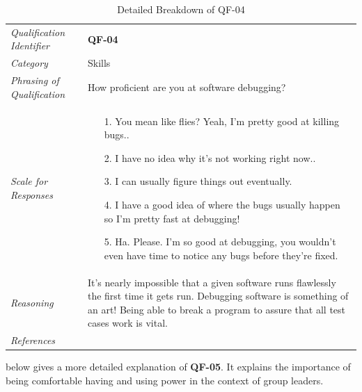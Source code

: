 \documentclass[12pt,letterpaper]{article}
\begin{document}
\begin{table}[H]
	\caption{Detailed Breakdown of QF-04}
	\begin{tabu} to 
		\toprule
		Qualification Identifier & {\bf QF-04}\\
		Category & Skills \\
		Phrasing of Qualification & How proficient are you at software debugging? \\
		Scale for Responses &
		\begin{minipage}[t]{\linewidth}
			\begin{enumerate}
				\item[1.] You mean like flies? Yeah, I'm pretty good at killing bugs..
				\item[2.] I have no idea why it's not working right now..
				\item[3.] I can usually figure things out eventually.
				\item[4.] I have a good idea of where the bugs usually happen so I'm pretty fast at debugging!
				\item[5.] Ha. Please. I'm so good at debugging, you wouldn't even have time to notice any bugs before they're fixed.
			\end{enumerate}
		\end{minipage}\\
		Reasoning & It's nearly impossible that a given software runs flawlessly the first time it gets run. Debugging software is something of an art! Being able to break a program to assure that all test cases work is vital.\\
		References & \\
		\toprule
	\end{tabu}
\end{table}

\newpage{}

 below gives a more detailed explanation of {\bf QF-05}. It explains the importance of being comfortable having and using power in the context of group leaders.
\end{document}
